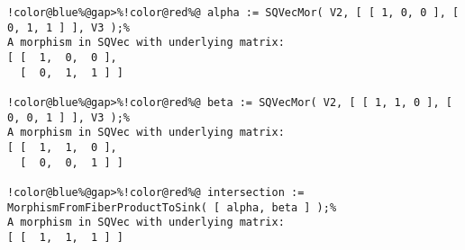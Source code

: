 \begin{Verbatim}[commandchars=!@\%,frame=single]
!color@blue%@gap>%!color@red%@ alpha := SQVecMor( V2, [ [ 1, 0, 0 ], [ 0, 1, 1 ] ], V3 );%
A morphism in SQVec with underlying matrix:
[ [  1,  0,  0 ],
  [  0,  1,  1 ] ]

!color@blue%@gap>%!color@red%@ beta := SQVecMor( V2, [ [ 1, 1, 0 ], [ 0, 0, 1 ] ], V3 );%
A morphism in SQVec with underlying matrix:
[ [  1,  1,  0 ],
  [  0,  0,  1 ] ]

!color@blue%@gap>%!color@red%@ intersection := MorphismFromFiberProductToSink( [ alpha, beta ] );%
A morphism in SQVec with underlying matrix:
[ [  1,  1,  1 ] ]

\end{Verbatim}
